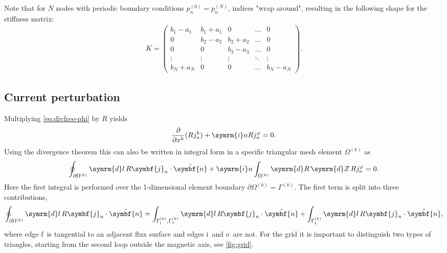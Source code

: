 \documentclass[a4paper, 10pt, english]{article}
\let\temp\varrho
\let\varrho\rho
\let\rho\temp
\let\temp\vartheta
\let\vartheta\theta
\let\theta\temp
\let\temp\varphi
\let\varphi\phi
\let\phi\temp
\let\vec\symbf
\newcommand*\diff{\ensuremath{\symrm{d}}}  %
\newcommand*\im{\ensuremath{\symrm{i}}}  %
\newcommand*\pd[2][]{\ensuremath{\frac{\partial #1}{\partial #2}}}  %
\newcommand*\fs{\ensuremath{\textrm{f}}}  %
\newcommand*\inw{\ensuremath{\textrm{i}}}  %
\newcommand*\out{\ensuremath{\textrm{o}}}  %
\begin{document}
Note that for $N$ nodes with periodic boundary conditions $p_{n}^{(0)} = p_{n}^{(N)}$, indices "wrap around", resulting in the following shape for the stiffness matrix:
\begin{gather*}
  K = \begin{pmatrix}
    b_{1} - a_{1} &  b_{1} + a_{1} &        0       & \hdots &    0   \\
           0       & b_{2} - a_{2} &  b_{2} + a_{2} & \hdots &    0   \\
           0       &        0       & b_{3} - a_{3} & \hdots &    0   \\
        \vdots     &     \vdots     &     \vdots     & \ddots & \vdots \\
     b_{N} + a_{N} &        0       &        0       & \hdots & b_{N} - a_{N}
  \end{pmatrix}.
\end{gather*}

\subsection{Current perturbation}

Multiplying \cref{eq:divfree-phi} by $R$ yields
\begin{gather}
  \pd{x^{k}} (R j_{n}^{k}) + \im n R j_{n}^{\phi} = 0.
\end{gather}
Using the divergence theorem this can also be written in integral form in a specific triangular mesh element $\Omega^{(k)}$ as
\begin{gather}
  \oint_{\partial \Omega^{(k)}} \diff l \, R \vec{j}_{n} \cdot \hat{\vec{n}} + \im n \int_{\Omega^{(k)}} \diff R \, \diff Z \, R j_{n}^{\phi} = 0.
\end{gather}
Here the first integral is performed over the 1-dimensional element boundary $\partial \Omega^{(k)} = \Gamma^{(k)}$. The first term is split into three contributions,
\begin{gather}
  \oint_{\partial \Omega^{(k)}} \diff l \, R \vec{j}_{n} \cdot \hat{\vec{n}} = \int_{\Gamma_{\inw}^{(k)}, \Gamma_{\out}^{(k)}} \diff l \, R \vec{j}_{n} \cdot \hat{\vec{n}} + \int_{\Gamma_{\fs}^{(k)}} \diff l \, R \vec{j}_{n} \cdot \hat{\vec{n}},
\end{gather}
where edge \fs\ is tangential to an adjacent flux surface and edges \inw\ and \out\ are not. For the grid it is important to distinguish two types of triangles, starting from the second loop outside the magnetic axis, see \cref{fig:grid}.
\end{document}
